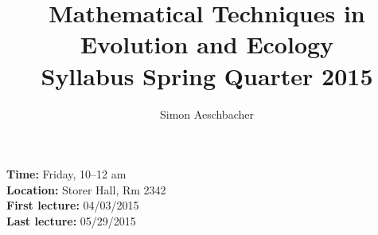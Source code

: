 \documentclass[
	letterpaper,
	12pt
]{article}
\begin{document}
\title{Mathematical Techniques in Evolution and Ecology\\Syllabus Spring Quarter 2015}
\author{Simon Aeschbacher}

\maketitle
\thispagestyle{empty}

\noindent \textbf{Time:} Friday, 10--12 am\\
\textbf{Location:} Storer Hall, Rm 2342\\
\textbf{First lecture:} 04/03/2015\\
\textbf{Last lecture:} 05/29/2015\\

\renewcommand{\arraystretch}{1.75}
\end{document}

